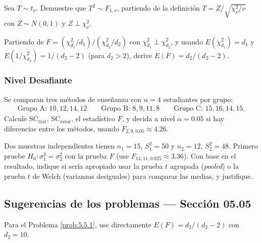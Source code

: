 \begin{problema}
	\label{prob:5.5.7}
	Sea $T \sim t_\nu$. Demuestre que $T^2 \sim F_{1,\nu}$, partiendo de la definición $T=Z/\sqrt{\chi^2_\nu/\nu}$ con $Z\sim N(0,1)$ y $Z\perp\chi^2_\nu$.
\end{problema}

\begin{problema}
	\label{prob:5.5.8}
	Partiendo de $F=(\chi^2_{d_1}/d_1)/(\chi^2_{d_2}/d_2)$ con $\chi^2_{d_1}\perp\chi^2_{d_2}$, y usando $E(\chi^2_{d_1})=d_1$ y $E(1/\chi^2_{d_2})=1/(d_2-2)$ (para $d_2>2$), derive $E(F)=d_2/(d_2-2)$.
\end{problema}

\subsubsection*{Nivel Desafiante}

\begin{problema}
	\label{prob:5.5.9}
	Se comparan tres métodos de enseñanza con $n=4$ estudiantes por grupo:
	\begin{align*}
		\text{Grupo A: } 10, 12, 14, 12 \qquad \text{Grupo B: } 8, 9, 11, 8 \qquad \text{Grupo C: } 15, 16, 14, 15.
	\end{align*}
	Calcule $\text{SC}_{\text{trat}}$, $\text{SC}_{\text{error}}$, el estadístico $F$, y decida a nivel $\alpha=0.05$ si hay diferencias entre los métodos, usando $F_{2,9,0.05}\approx 4.26$.
\end{problema}

\begin{problema}
	\label{prob:5.5.10}
	Dos muestras independientes tienen $n_1=15$, $S_1^2=50$ y $n_2=12$, $S_2^2=48$. Primero pruebe $H_0:\sigma_1^2=\sigma_2^2$ con la prueba $F$ (use $F_{14,11,0.025}\approx 3.36$). Con base en el resultado, indique si sería apropiado usar la prueba $t$ agrupada (\emph{pooled}) o la prueba $t$ de Welch (varianzas desiguales) para comparar las medias, y justifique.
\end{problema}

\subsection*{Sugerencias de los problemas --- Sección 05.05}

\begin{sugerencia}
	\label{sug:5.5.1}
	Para el Problema \ref{prob:5.5.1}, use directamente $E(F)=d_2/(d_2-2)$ con $d_2=10$.
\end{sugerencia}

